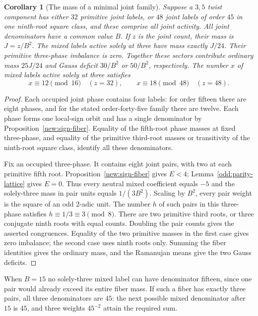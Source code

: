 \documentclass[11pt]{amsart}
\numberwithin{equation}{section}
\newtheorem{corollary}[theorem]{Corollary}
\theoremstyle{definition}
\theoremstyle{plain}
\begin{document}
\begin{corollary}[The mass of a minimal joint family]\label{new:rigid-family}
Suppose a $3,5$ twist component has either $32$ primitive joint
labels, or $48$ joint labels of order $45$ in one ninth-root square
class, and these comprise all joint activity. All joint denominators
have a common value $B$. If $z$ is the joint count, their mass is
$J=z/B^2$. The mixed labels active solely at three have mass exactly
$J/24$. Their primitive three-phase imbalance is zero. Together
these sectors contribute ordinary mass $25J/24$ and Gauss deficit
$30/B^2$ or $50/B^2$, respectively. The number $x$ of mixed labels
active solely at three satisfies
\[
   x\equiv12\pmod{16}\quad(z=32),\qquad
   x\equiv18\pmod{48}\quad(z=48).
\]
\end{corollary}
\begin{proof}
Each occupied joint phase contains four labels: for order fifteen
there are eight phases, and for the stated order-forty-five family
there are twelve. Each phase forms one local-sign orbit and has a
single denominator by Proposition~\ref{new:sign-fiber}. Equality
of the fifth-root phase masses at fixed three-phase, and equality
of the primitive third-root masses or transitivity of the ninth-root
square class, identify all these denominators.

Fix an occupied three-phase. It contains eight joint pairs, with
two at each primitive fifth root. Proposition~\ref{new:sign-fiber}
gives $E<4$; Lemma~\ref{odd:parity-lattice} gives $E=0$. Thus
every neutral mixed coefficient equals $-5$ and the solely-three
mass in pair units equals $1/(3B^2)$. Scaling by $B^2$, every pair
weight is the square of an odd $2$-adic unit. The number $h$ of
such pairs in this three-phase satisfies $h\equiv1/3\equiv3\pmod8$.
There are two primitive third roots, or three conjugate ninth roots
with equal counts. Doubling the pair counts gives the asserted
congruences. Equality of the two primitive masses in the first
case gives zero imbalance; the second case uses ninth roots only.
Summing the fiber identities gives the ordinary mass, and the
Ramanujan means give the two Gauss deficits.
\end{proof}

When $B=15$ no solely-three mixed label can have denominator fifteen,
since one pair would already exceed its entire fiber mass. If such
a fiber has exactly three pairs, all three denominators are $45$:
the next possible mixed denominator after $15$ is $45$, and three
weights $45^{-2}$ attain the required sum.
\end{document}
